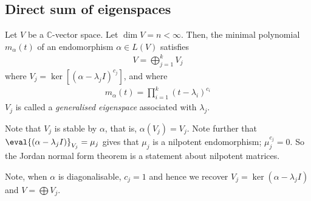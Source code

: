\subsection{Direct sum of eigenspaces}
\begin{theorem}
	Let $V$ be a $\mathbb C$-vector space.
	Let $\dim V = n < \infty$.
	Then, the minimal polynomial $m_\alpha(t)$ of an endomorphism $\alpha \in L(V)$ satisfies
	\begin{align*}
		V = \bigoplus_{j=1}^k V_j
	\end{align*}
	where $V_j = \ker[(\alpha - \lambda_j I)^{c_j}]$, and where
	\begin{align*}
		m_\alpha(t) = \prod_{i=1}^k (t - \lambda_i)^{c_i}
	\end{align*}
	$V_j$ is called a \textit{generalised eigenspace} associated with $\lambda_j$.
\end{theorem}
\begin{remark}
	Note that $V_j$ is stable by $\alpha$, that is, $\alpha(V_j) = V_j$.
	Note further that $\eval{(\alpha - \lambda_j I)}_{V_j} = \mu_j$ gives that $\mu_j$ is a nilpotent endomorphism; $\mu_j^{c_j} = 0$.
	So the Jordan normal form theorem is a statement about nilpotent matrices.

	Note, when $\alpha$ is diagonalisable, $c_j = 1$ and hence we recover $V_j = \ker(\alpha - \lambda_j I)$ and $V = \bigoplus V_j$.
\end{remark}

